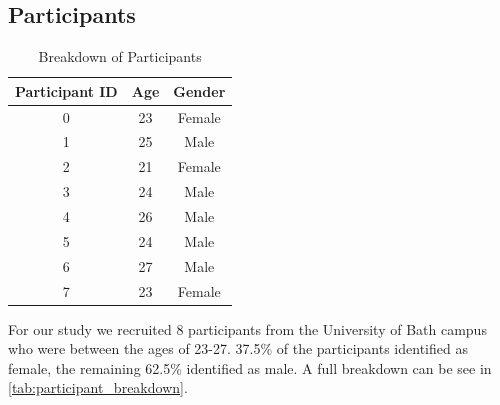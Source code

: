 \subsection{Participants}
\begin{table}
    \centering
    \caption{Breakdown of Participants}
    \label{tab:participant_breakdown}
    \begin{tabular}{ c | c | c }
        Participant ID & Age & Gender \\
        \hline
        0 & 23 & Female \\
        1 & 25 & Male \\
        2 & 21 & Female \\
        3 & 24 & Male \\
        4 & 26 & Male \\
        5 & 24 & Male \\
        6 & 27 & Male \\
        7 & 23 & Female \\
        \hline
    \end{tabular}
\end{table}
For our study we recruited 8 participants from the University of Bath campus who were between the ages of 23-27.
37.5\% of the participants identified as female, the remaining 62.5\% identified as male. A full breakdown can be see in \autoref{tab:participant_breakdown}.


